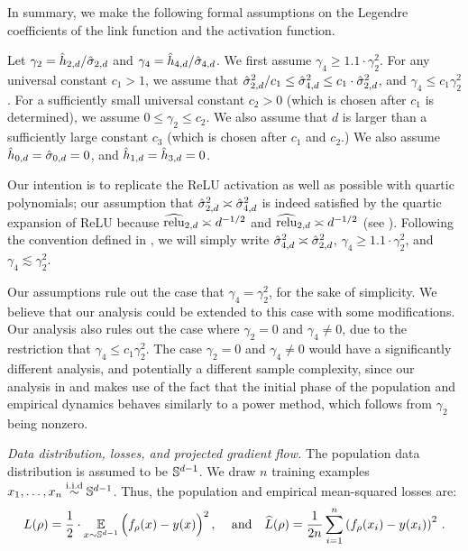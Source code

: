 In summary, we make the following formal assumptions on the Legendre coefficients of the link function and the activation function.

\begin{assumption} \label{assumption:target}
Let $\gamma_2 = \hat{h}_{2,d}/\hat{\sigma}_{2, d}$ and $\gamma_4 = \hat{h}_{4,d}/\hat{\sigma}_{4, d}$.  We first assume $\gamma_4 \ge 1.1\cdot\gamma_2^2$. For any universal constant $c_1 > 1$, we assume that $\hat{\sigma}_{2, d}^2/c_1 \le \hat{\sigma}_{4, d}^2 \le c_1\cdot \hat{\sigma}_{2, d}^2$, and $\gamma_4 \le c_1 \gamma_2^2$. For a sufficiently small universal constant $c_2 > 0$ (which is chosen after $c_1$ is determined), we assume $0 \le \gamma_2 \le c_2$. We also assume that $d$ is larger than a sufficiently large constant $c_3$ (which is chosen after $c_1$ and $c_2$.)
We also assume $\hat{h}_{0,d} = \hat{\sigma}_{0,d} = 0$, and $\hat{h}_{1,d} = \hat{h}_{3,d} = 0$. 
\end{assumption}

Our intention is to replicate the ReLU activation as well as possible with quartic polynomials; our assumption that $\hat{\sigma}_{2, d}^2\asymp \hat{\sigma}_{4, d}^2$ is indeed satisfied by the quartic expansion of ReLU because $\widehat{\textup{relu}}_{2,d} \asymp d^{-1/2}$ and $\widehat{\textup{relu}}_{2,d} \asymp d^{-1/2}$ (see ). Following the convention defined in , we will simply write $\hat{\sigma}_{4, d}^2 \asymp \hat{\sigma}_{2, d}^2$, $\gamma_4 \ge 1.1\cdot\gamma_2^2$, and $\gamma_4 \lesssim \gamma_2^2$.

Our assumptions rule out the case that $\gamma_4 = \gamma_2^2$, for the sake of simplicity. We believe that our analysis could be extended to this case with some modifications. Our analysis also rules out the case where $\gamma_2 = 0$ and $\gamma_4 \neq 0$, due to the restriction that $\gamma_4 \leq c_1 \gamma_2^2$. The case $\gamma_2 = 0$ and $\gamma_4 \neq 0$ would have a significantly different analysis, and potentially a different sample complexity, since our analysis in  and  makes use of the fact that the initial phase of the population and empirical dynamics behaves similarly to a power method, which follows from $\gamma_2$ being nonzero.
 

\textit{Data distribution, losses, and projected gradient flow.} The population data distribution is assumed to be $\mathbb{S}^{d-1}$. We draw $n$ training examples $x_1,\dots, x_n\overset{\textup{i.i.d}}{\sim} \mathbb{S}^{d-1}$. Thus, the population and empirical mean-squared losses are: 
\begin{align}
L(\rho) &= \frac{1}{2}\cdot \operatorname*{\mathbb{E}}_{x \sim \mathbb{S}^{d - 1}} \Big(f_\rho(x) - y(x)\Big)^2\,, & \textup{ and ~~} 
\widehat{L}(\rho) = \frac{1}{2n}\sum_{i=1}^n \left(f_\rho(x_i) - y(x_i)\right)^2 \,.
\end{align}

